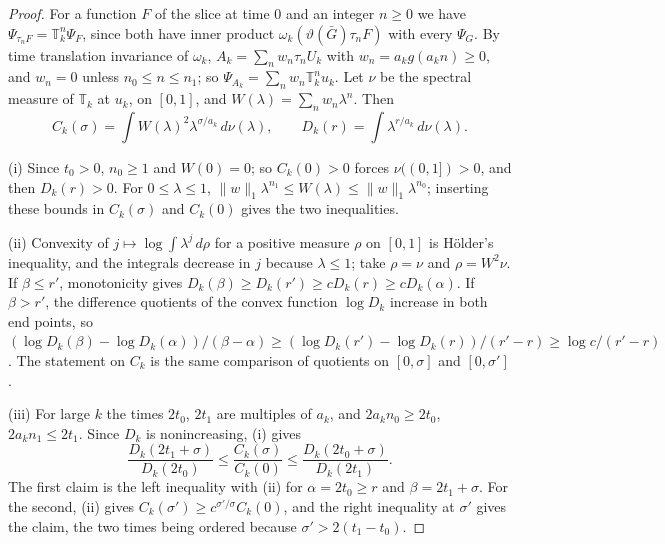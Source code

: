 \documentclass[aps,prd,twocolumn,superscriptaddress,nofootinbib,longbibliography,floatfix,amsmath,amssymb,10pt]{revtex4-2}
\theoremstyle{definition}
\theoremstyle{remark}
\begin{document}
\begin{proof}
For a function $F$ of the slice at time $0$ and an integer $n\ge0$ we have
$\Psi_{\tau_nF}=\mathbb T_k^n\Psi_F$, since both have inner product
$\omega_k(\vartheta(\bar G)\tau_nF)$ with every $\Psi_G$. By time translation
invariance of $\omega_k$,
$A_k=\sum_nw_n\tau_nU_k$ with $w_n=a_kg(a_kn)\ge0$, and $w_n=0$ unless
$n_0\le n\le n_1$; so $\Psi_{A_k}=\sum_nw_n\mathbb T_k^nu_k$. Let $\nu$ be the
spectral measure of $\mathbb T_k$ at $u_k$, on $[0,1]$, and
$W(\lambda)=\sum_nw_n\lambda^n$. Then
\[
C_k(\sigma)=\int W(\lambda)^2\lambda^{\sigma/a_k}\,d\nu(\lambda),\qquad
D_k(r)=\int\lambda^{r/a_k}\,d\nu(\lambda).
\]

(i) Since $t_0>0$, $n_0\ge1$ and $W(0)=0$; so $C_k(0)>0$ forces $\nu((0,1])>0$, and then
$D_k(r)>0$. For $0\le\lambda\le1$,
$\|w\|_1\lambda^{n_1}\le W(\lambda)\le\|w\|_1\lambda^{n_0}$; inserting these
bounds in $C_k(\sigma)$ and $C_k(0)$ gives the two inequalities.

(ii) Convexity of $j\mapsto\log\int\lambda^j\,d\rho$ for a positive measure
$\rho$ on $[0,1]$ is H\"older's inequality, and the integrals decrease in $j$
because $\lambda\le1$; take $\rho=\nu$ and $\rho=W^2\nu$. If
$\beta\le r'$, monotonicity gives
$D_k(\beta)\ge D_k(r')\ge cD_k(r)\ge cD_k(\alpha)$. If $\beta>r'$, the
difference quotients of the convex function $\log D_k$ increase in both
end points, so $(\log D_k(\beta)-\log D_k(\alpha))/(\beta-\alpha)\ge
(\log D_k(r')-\log D_k(r))/(r'-r)\ge\log c/(r'-r)$. The
statement on $C_k$ is the same comparison of quotients on $[0,\sigma]$ and
$[0,\sigma']$.

(iii) For large $k$ the times $2t_0$, $2t_1$ are multiples of $a_k$, and
$2a_kn_0\ge2t_0$, $2a_kn_1\le2t_1$. Since $D_k$ is nonincreasing, (i) gives
\[
\frac{D_k(2t_1+\sigma)}{D_k(2t_0)}\le\frac{C_k(\sigma)}{C_k(0)}\le
\frac{D_k(2t_0+\sigma)}{D_k(2t_1)} .
\]
The first claim is the left inequality with (ii) for $\alpha=2t_0\ge r$ and
$\beta=2t_1+\sigma$. For the second, (ii) gives $C_k(\sigma')\ge
c^{\sigma'/\sigma}C_k(0)$, and the right inequality at $\sigma'$ gives the
claim, the two times being ordered because $\sigma'>2(t_1-t_0)$.
\end{proof}
\end{document}
